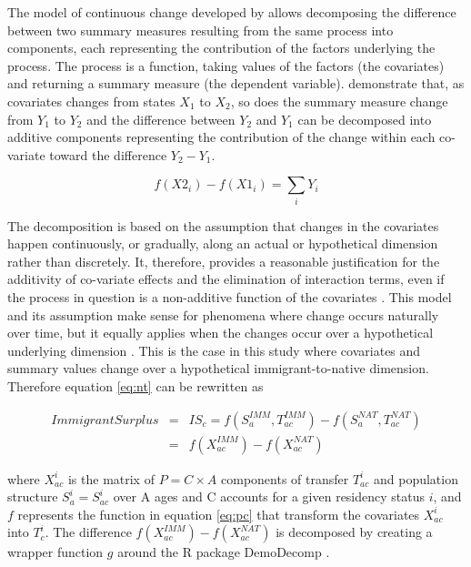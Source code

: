 The model of continuous change developed by \citet{Horiuchi:2008cn} allows decomposing the difference between two summary measures resulting from the same process into components, each representing the contribution of the factors underlying the process.
The process is a function, taking values of the factors (the covariates) and returning a summary measure (the dependent variable). \citet{Horiuchi:2008cn} demonstrate that, as covariates changes from states \( X_1 \) to \( X_2 \),  so does the summary measure change from \( Y_1 \) to \( Y_2 \)  and the difference between \( Y_2 \) and \( Y_1 \) can be decomposed into additive components representing the contribution of the change within each co-variate toward the difference \( Y_2 - Y_1\).

\begin{equation}\label{eq:ho}
  f(X2_{i}) - f(X1_{i}) = \displaystyle\sum_{i}Y_{i}
\end{equation}

The decomposition is based on the assumption that changes in the covariates happen continuously, or gradually, along an actual or hypothetical dimension rather than discretely.
It, therefore, provides a reasonable justification for the additivity of co-variate effects and the elimination of interaction terms, even if the process in question is a non-additive function of the covariates \citep[p.~786]{Horiuchi:2008cn}.
This model and its assumption make sense for phenomena where change occurs naturally over time, but it equally applies when the changes occur over a hypothetical underlying dimension \citep[p.~790]{Horiuchi:2008cn}.
This is the case in this study where covariates and summary values change over a hypothetical immigrant-to-native dimension.
Therefore equation \eqref{eq:nt} can be rewritten as

\begin{eqnarray}
  Immigrant Surplus &=&IS_{c}=f(S^{IMM}_a, T^{IMM}_{ac})-f(S^{NAT}_a, T^{NAT}_{ac}) \nonumber \\
&=& f(X^{IMM}_{ac})-f(X^{NAT}_{ac}) \label{eq:dc}
\end{eqnarray}

\vspace{0.7em}\par
where \( X^{i}_{ac}\) is the matrix of \( P=C \times A  \) components of transfer \( T^{i}_{ac} \) and population structure \( S^{i}_{a}=S^{i}_{ac} \) over A ages and C accounts for a given residency status \( i \), and \( f \) represents the function in equation \eqref{eq:pc} that transform the covariates \( X^{i}_{ac}\) into \(T^{i}_c\).
The difference \( f(X^{IMM}_{ac}) - f(X^{NAT}_{ac}) \) is decomposed by creating a wrapper function \(g\) around the R package DemoDecomp \citep{DemoDecomp:2018,Rstat:2018}.

